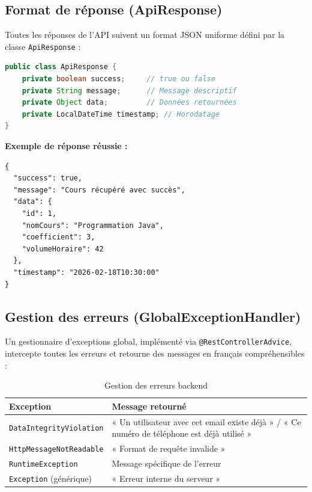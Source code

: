 \subsection{Format de réponse (ApiResponse)}

Toutes les réponses de l'API suivent un format JSON uniforme défini par la classe \texttt{ApiResponse} :

\begin{lstlisting}[language=Java,caption={Structure de la réponse API (ApiResponse.java)}]
public class ApiResponse {
    private boolean success;     // true ou false
    private String message;      // Message descriptif
    private Object data;         // Données retournées
    private LocalDateTime timestamp; // Horodatage
}
\end{lstlisting}

\textbf{Exemple de réponse réussie :}
\begin{lstlisting}[caption={Exemple de réponse JSON}]
{
  "success": true,
  "message": "Cours récupéré avec succès",
  "data": {
    "id": 1,
    "nomCours": "Programmation Java",
    "coefficient": 3,
    "volumeHoraire": 42
  },
  "timestamp": "2026-02-18T10:30:00"
}
\end{lstlisting}

\subsection{Gestion des erreurs (GlobalExceptionHandler)}

Un gestionnaire d'exceptions global, implémenté via \texttt{@RestControllerAdvice}, intercepte toutes les erreurs et retourne des messages en français compréhensibles :

\begin{table}[H]
\centering
\caption{Gestion des erreurs backend}
\label{tab:errors}
\begin{tabularx}{\textwidth}{lX}
\toprule
\textbf{Exception} & \textbf{Message retourné} \\
\midrule
\texttt{DataIntegrityViolation} & « Un utilisateur avec cet email existe déjà » / « Ce numéro de téléphone est déjà utilisé » \\
\texttt{HttpMessageNotReadable} & « Format de requête invalide » \\
\texttt{RuntimeException} & Message spécifique de l'erreur \\
\texttt{Exception} (générique) & « Erreur interne du serveur » \\
\bottomrule
\end{tabularx}
\end{table}


